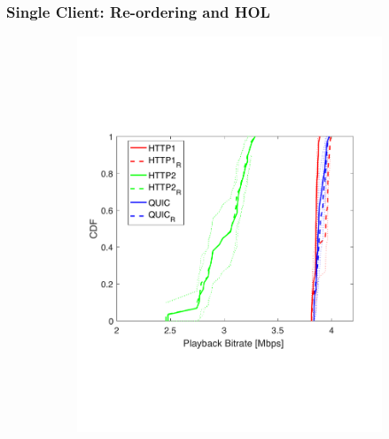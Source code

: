 \subsubsection{Single Client: Re-ordering and HOL}
\label{subsubsec:hol}
\begin{figure}[htb!]
\centering
\begin{subfigure}[t]{0.33\textwidth}
   \captionsetup{justification=centering,margin=0.5cm}
    \includegraphics[trim={0 5cm 0 7cm}, scale=0.246]{figures/CDF_bitrat_squad_sdn_p1p2_nd18.pdf}
     \caption{}
    \label{fig:sdn_p1_p2bitrate}
  \end{subfigure}
  \begin{subfigure}[t]{0.33\textwidth}
  \captionsetup{justification=raggedright,singlelinecheck=false,margin=2.5cm}

\end{subfigure}
\end{figure}
